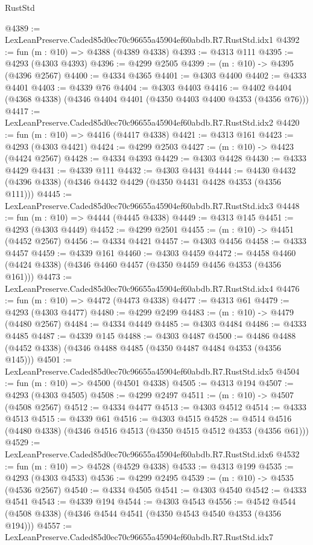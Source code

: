\begin{lexlean}{RustStd}
\begin{coremodule}
@4389 := LexLeanPreserve.Caded85d0ec70c96655a45904ef60abdb.R7.RustStd.idx1
@4392 := fun (m : @10) => @4388 (@4389 @4338)
@4393 := @4313 @111
@4395 := @4293 (@4303 @4393)
@4396 := @4299 @2505
@4399 := (m : @10) -> @4395 (@4396 @2567)
@4400 := @4334 @4365
@4401 := @4303 @4400
@4402 := @4333 @4401
@4403 := @4339 @76
@4404 := @4303 @4403
@4416 := @4402 @4404 (@4368 @4338) (@4346 @4404 @4401 (@4350 @4403 @4400 @4353 (@4356 @76)))
@4417 := LexLeanPreserve.Caded85d0ec70c96655a45904ef60abdb.R7.RustStd.idx2
@4420 := fun (m : @10) => @4416 (@4417 @4338)
@4421 := @4313 @161
@4423 := @4293 (@4303 @4421)
@4424 := @4299 @2503
@4427 := (m : @10) -> @4423 (@4424 @2567)
@4428 := @4334 @4393
@4429 := @4303 @4428
@4430 := @4333 @4429
@4431 := @4339 @111
@4432 := @4303 @4431
@4444 := @4430 @4432 (@4396 @4338) (@4346 @4432 @4429 (@4350 @4431 @4428 @4353 (@4356 @111)))
@4445 := LexLeanPreserve.Caded85d0ec70c96655a45904ef60abdb.R7.RustStd.idx3
@4448 := fun (m : @10) => @4444 (@4445 @4338)
@4449 := @4313 @145
@4451 := @4293 (@4303 @4449)
@4452 := @4299 @2501
@4455 := (m : @10) -> @4451 (@4452 @2567)
@4456 := @4334 @4421
@4457 := @4303 @4456
@4458 := @4333 @4457
@4459 := @4339 @161
@4460 := @4303 @4459
@4472 := @4458 @4460 (@4424 @4338) (@4346 @4460 @4457 (@4350 @4459 @4456 @4353 (@4356 @161)))
@4473 := LexLeanPreserve.Caded85d0ec70c96655a45904ef60abdb.R7.RustStd.idx4
@4476 := fun (m : @10) => @4472 (@4473 @4338)
@4477 := @4313 @61
@4479 := @4293 (@4303 @4477)
@4480 := @4299 @2499
@4483 := (m : @10) -> @4479 (@4480 @2567)
@4484 := @4334 @4449
@4485 := @4303 @4484
@4486 := @4333 @4485
@4487 := @4339 @145
@4488 := @4303 @4487
@4500 := @4486 @4488 (@4452 @4338) (@4346 @4488 @4485 (@4350 @4487 @4484 @4353 (@4356 @145)))
@4501 := LexLeanPreserve.Caded85d0ec70c96655a45904ef60abdb.R7.RustStd.idx5
@4504 := fun (m : @10) => @4500 (@4501 @4338)
@4505 := @4313 @194
@4507 := @4293 (@4303 @4505)
@4508 := @4299 @2497
@4511 := (m : @10) -> @4507 (@4508 @2567)
@4512 := @4334 @4477
@4513 := @4303 @4512
@4514 := @4333 @4513
@4515 := @4339 @61
@4516 := @4303 @4515
@4528 := @4514 @4516 (@4480 @4338) (@4346 @4516 @4513 (@4350 @4515 @4512 @4353 (@4356 @61)))
@4529 := LexLeanPreserve.Caded85d0ec70c96655a45904ef60abdb.R7.RustStd.idx6
@4532 := fun (m : @10) => @4528 (@4529 @4338)
@4533 := @4313 @199
@4535 := @4293 (@4303 @4533)
@4536 := @4299 @2495
@4539 := (m : @10) -> @4535 (@4536 @2567)
@4540 := @4334 @4505
@4541 := @4303 @4540
@4542 := @4333 @4541
@4543 := @4339 @194
@4544 := @4303 @4543
@4556 := @4542 @4544 (@4508 @4338) (@4346 @4544 @4541 (@4350 @4543 @4540 @4353 (@4356 @194)))
@4557 := LexLeanPreserve.Caded85d0ec70c96655a45904ef60abdb.R7.RustStd.idx7

\end{coremodule}
\end{lexlean}
